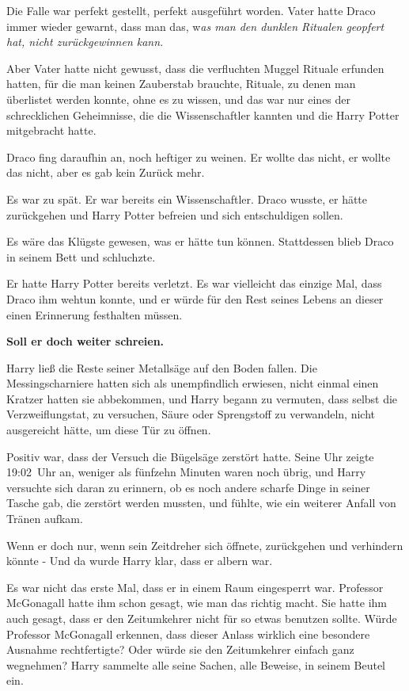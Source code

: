 {Die Falle war perfekt gestellt, perfekt ausgeführt worden. Vater hatte Draco immer wieder gewarnt, dass man das, w\emph{as man den dunklen Ritualen geopfert hat, nicht zurückgewinnen kann.}

Aber Vater hatte nicht gewusst, dass die verfluchten Muggel Rituale erfunden hatten, für die man keinen Zauberstab brauchte, Rituale, zu denen man überlistet werden konnte, ohne es zu wissen, und das war nur eines der schrecklichen Geheimnisse, die die Wissenschaftler kannten und die Harry Potter mitgebracht hatte.

Draco fing daraufhin an, noch heftiger zu weinen. Er wollte das nicht, er wollte das nicht, aber es gab kein Zurück mehr.

Es war zu spät. Er war bereits ein Wissenschaftler. Draco wusste, er hätte zurückgehen und Harry Potter befreien und sich entschuldigen sollen.

Es wäre das Klügste gewesen, was er hätte tun können. Stattdessen blieb Draco in seinem Bett und schluchzte.

Er hatte Harry Potter bereits verletzt. Es war vielleicht das einzige Mal, dass Draco ihm wehtun konnte, und er würde für den Rest seines Lebens an dieser einen Erinnerung festhalten müssen.

\textbf{Soll er doch weiter schreien.}

Harry ließ die Reste seiner Metallsäge auf den Boden fallen. Die Messingscharniere hatten sich als unempfindlich erwiesen, nicht einmal einen Kratzer hatten sie abbekommen, und Harry begann zu vermuten, dass selbst die Verzweiflungstat, zu versuchen, Säure oder Sprengstoff zu verwandeln, nicht ausgereicht hätte, um diese Tür zu öffnen.

Positiv war, dass der Versuch die Bügelsäge zerstört hatte. Seine Uhr zeigte 19:02~Uhr an, weniger als fünfzehn Minuten waren noch übrig, und Harry versuchte sich daran zu erinnern, ob es noch andere scharfe Dinge in seiner Tasche gab, die zerstört werden mussten, und fühlte, wie ein weiterer Anfall von Tränen aufkam.

Wenn er doch nur, wenn sein Zeitdreher sich öffnete, zurückgehen und verhindern könnte - Und da wurde Harry klar, dass er albern war.

Es war nicht das erste Mal, dass er in einem Raum eingesperrt war. Professor McGonagall hatte ihm schon gesagt, wie man das richtig macht. Sie hatte ihm auch gesagt, dass er den Zeitumkehrer nicht für so etwas benutzen sollte. Würde Professor McGonagall erkennen, dass dieser Anlass wirklich eine besondere Ausnahme rechtfertigte? Oder würde sie den Zeitumkehrer einfach ganz wegnehmen? Harry sammelte alle seine Sachen, alle Beweise, in seinem Beutel ein.

}
